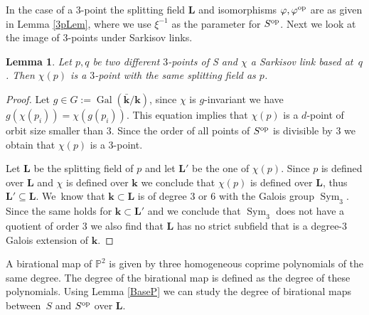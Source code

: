 \documentclass[JEP,XML,SOM,Unicode,NoFloatCountersInSection, NoEqCountersInSection,published]{cedram}
\newcommand{\op}{\textup{op}}
\DeclareMathOperator{\Gal}{Gal}
\DeclareMathOperator{\Sym}{Sym}
\newtheorem{lemma}[theorem]{Lemma}
\theoremstyle{definition}
\newcommand{\kk}{{\boldsymbol{k}}}
\newcommand{\LL}{{\boldsymbol{L}}}
\begin{document}
In the case of a $3$\nobreakdash-point the splitting field $\LL$ and isomorphisms $\varphi, \varphi^{\op}$ are as given in Lemma \ref{3pLem}, where we use $\xi^{-1}$ as the parameter for $S^{\op}$. Next we look at the image of $3$\nobreakdash-points under Sarkisov links.

\begin{lemma} \label{ImageOf3P}
Let $p,q$ be two different $3$\nobreakdash-points of S and $\chi$ a Sarkisov link based at~$q$. Then $\chi(p)$ is a $3$\nobreakdash-point with the same splitting field as $p$.
\end{lemma}

\begin{proof}
Let $g \in G:= \Gal(\bar{\kk}/\kk)$, since $\chi$ is $g$-invariant we have $g(\chi(p_i)) = \chi(g(p_i))$. This equation implies that $\chi(p)$ is a $d$-point of orbit size smaller than $3$. Since the order of all points of $S^{\op}$ is divisible by $3$ we obtain that $\chi(p)$ is a $3$\nobreakdash-point.

Let $\LL$ be the splitting field of $p$ and let $\LL'$ be the one of $\chi(p)$. Since $p$ is defined over $\LL$ and $\chi$ is defined over $\kk$ we conclude that $\chi(p)$ is defined over $\LL$, thus $\LL' \subseteq \LL$. We~know that $\kk \subset\LL$ is of degree $3$ or $6$ with the Galois group $\Sym_3$. Since the same holds for $\kk \subset \LL'$ and we conclude that $\Sym_3$ does not have a quotient of order $3$ we also find that $\LL$ has no strict subfield that is a degree-$3$ Galois extension of $\kk$.
\end{proof}
A birational map of $\mathbb{P}^2$ is given by three homogeneous coprime polynomials of the same degree. The degree of the birational map is defined as the degree of these polynomials. Using Lemma \ref{BaseP} we can study the degree of birational maps between~$S$ and $S^{\op}$ over $\LL$.
\end{document}

